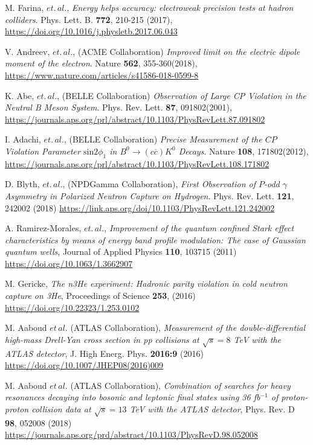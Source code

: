 \documentclass{article}
\begin{document}
\begin{thebibliography}{9}

M. Farina,  $et.\,al.$,
\textit{Energy helps accuracy: electroweak precision tests at hadron colliders}.
Phys. Lett. B. \textbf{772}, 210-215 (2017),
\url{https://doi.org/10.1016/j.physletb.2017.06.043}

V. Andreev, $et.\,al.$, (ACME Collaboration)
\textit{Improved limit on the electric dipole moment of the electron}.
Nature \textbf{562}, 355-360(2018),
\url{https://www.nature.com/articles/s41586-018-0599-8}

K. Abe, $et.\,al.$, (BELLE Collaboration)
\textit{Observation of Large CP Violation in the Neutral B Meson System}.
Phys. Rev. Lett. \textbf{87}, 091802(2001),
\url{https://journals.aps.org/prl/abstract/10.1103/PhysRevLett.87.091802}

I. Adachi, $et.\,al.$, (BELLE Collaboration)
\textit{Precise Measurement of the $CP$ Violation Parameter $\mathrm{sin}﻿2{\ensuremath{\phi}}_{1}$ in ${B}^{0}\ensuremath{\rightarrow}(c\overline{c}){K}^{0}$ Decays}.
Nature \textbf{108}, 171802(2012),
\url{https://journals.aps.org/prl/abstract/10.1103/PhysRevLett.108.171802}

D. Blyth, $et.\,al.$, (NPDGamma Collaboration),
\textit{First Observation of $P$-odd $\ensuremath{\gamma}$ Asymmetry in Polarized Neutron Capture on Hydrogen}.
Phys. Rev. Lett. \textbf{121},  242002 (2018)
\url{https://link.aps.org/doi/10.1103/PhysRevLett.121.242002} 
 
A. Ramirez-Morales, $et.\,al.$,
\textit{Improvement of the quantum confined Stark effect characteristics by means of energy band profile modulation: The case of Gaussian quantum wells},
Journal of Applied Physics  \textbf{110}, 103715 (2011)
\url{https://doi.org/10.1063/1.3662907}

M. Gericke,
\textit{The n3He experiment: Hadronic parity violation in cold neutron capture on 3He},
Proceedings of Science \textbf{253}, (2016)
\url{https://doi.org/10.22323/1.253.0102}

M. Aaboud $et\,al.$ (ATLAS Collaboration),
\textit{Measurement of the double-differential high-mass Drell-Yan cross section in pp collisions at $\sqrt{s}=8$ TeV with the ATLAS detector},
J. High Energ. Phys.  \textbf{2016:9} (2016)
\url{https://doi.org/10.1007/JHEP08(2016)009}

M. Aaboud $et\,al.$ (ATLAS Collaboration),
\textit{Combination of searches for heavy resonances decaying into bosonic and leptonic final states using 36 fb$^{-1}$ of proton-proton collision data at $\sqrt{s}=13$ TeV with the ATLAS detector},
Phys. Rev. D \textbf{98}, 052008 (2018)
\url{https://journals.aps.org/prd/abstract/10.1103/PhysRevD.98.052008}


\end{thebibliography}
\end{document}
